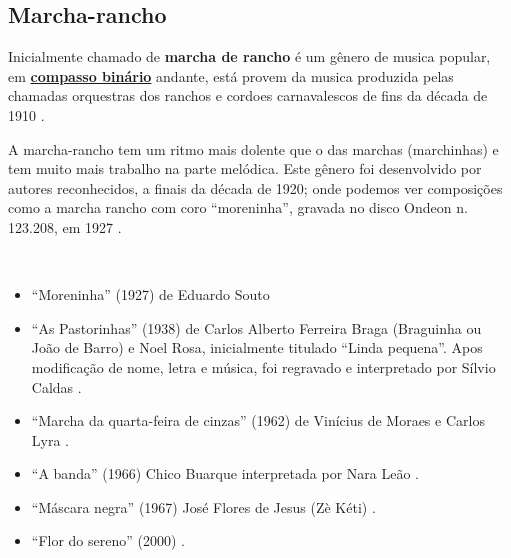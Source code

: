 \subsection{Marcha-rancho}
Inicialmente chamado de \textbf{marcha de rancho} \cite[pp. 448]{marcondes1977enciclopedia}
é um gênero de musica popular, em \hyperref[subsec:compassobinario]{\textbf{compasso binário}} andante, 
está provem da musica produzida pelas chamadas orquestras dos ranchos e cordoes 
carnavalescos de fins da década de 1910 \cite[pp. 65]{reinato2010musica} \cite[pp. 448]{marcondes1977enciclopedia}.

A marcha-rancho tem um ritmo mais dolente que o das marchas (marchinhas)
e tem muito mais trabalho na parte melódica. 
Este gênero foi desenvolvido por autores reconhecidos, 
a finais da década de 1920;
onde podemos ver composições como a marcha rancho com coro ``moreninha'',
gravada no disco Ondeon n. 123.208, em 1927 \cite[pp. 448]{marcondes1977enciclopedia}.

\begin{example} ~

\begin{itemize}
\item ``Moreninha'' (1927) de Eduardo Souto \cite[pp. 448]{marcondes1977enciclopedia}
\item ``As Pastorinhas'' (1938) de Carlos Alberto Ferreira Braga (Braguinha ou João de Barro) e Noel Rosa, 
inicialmente titulado ``Linda pequena''.
Apos modificação de nome, letra e música, 
foi regravado e interpretado por Sílvio Caldas \cite[pp. 1066]{marcondes1977enciclopediav2} \cite[pp. 87]{diniz2008almanaque}.
\item ``Marcha da quarta-feira de cinzas'' (1962) de Vinícius de Moraes e Carlos Lyra \cite[pp. 1021]{marcondes1977enciclopediav2} \cite[pp. 91]{diniz2008almanaque}.
\item ``A banda'' (1966) Chico Buarque interpretada por Nara Leão \cite[pp. 90]{diniz2008almanaque} \cite{partituraabanda1}.
\item ``Máscara negra'' (1967) José Flores de Jesus (Zè Kéti)  \cite[pp. 89]{diniz2008almanaque}.
\item ``Flor do sereno'' (2000)  \cite[pp. 88]{diniz2008almanaque}.

\end{itemize}
\end{example}

